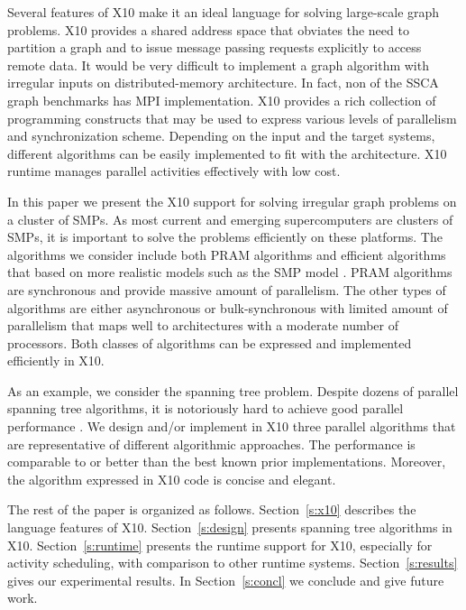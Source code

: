  Several features of X10 make it an ideal language for solving large-scale graph problems. X10 provides a shared address space that obviates the need to partition a graph and to issue message passing requests explicitly to access remote data. It would be very difficult to implement a graph algorithm with irregular inputs on distributed-memory architecture.  In fact, non of the SSCA graph benchmarks has MPI implementation. X10 provides a rich collection of programming constructs that may be used to express various levels of parallelism and synchronization scheme. Depending on the input and the target systems, different algorithms can be easily implemented to fit with the architecture. X10 runtime manages parallel activities effectively with low cost.

 In this paper we present the X10 support for solving irregular graph problems on a cluster of SMPs. As most current and emerging supercomputers are clusters of SMPs, it is important to solve the problems efficiently on these platforms. The algorithms we consider include both PRAM algorithms and efficient algorithms that based on more realistic models such as the SMP model \cite{HJ01}. PRAM algorithms are synchronous and provide massive amount of parallelism. The other types of algorithms are either asynchronous or bulk-synchronous with limited amount of parallelism that maps well to architectures with a moderate number of processors. Both classes of algorithms can be expressed and implemented efficiently in X10.

As an example, we consider the spanning tree problem. Despite dozens of parallel spanning tree algorithms, it is notoriously hard to achieve good parallel performance \cite{BC04a}. We design and/or implement in X10 three parallel algorithms that are representative of different algorithmic approaches. The performance is comparable to or better than the best known prior implementations. Moreover, the algorithm expressed in X10 code is concise and elegant.

 The rest of the paper is organized as follows. Section~\ref{s:x10} describes the language features of X10. Section~\ref{s:design} presents spanning tree algorithms in X10. Section~\ref{s:runtime} presents the runtime support for X10, especially for activity scheduling, with comparison to other runtime systems. 
 Section~\ref{s:results} gives our experimental results. In Section~\ref{s:concl} we conclude and give future work. 
  


